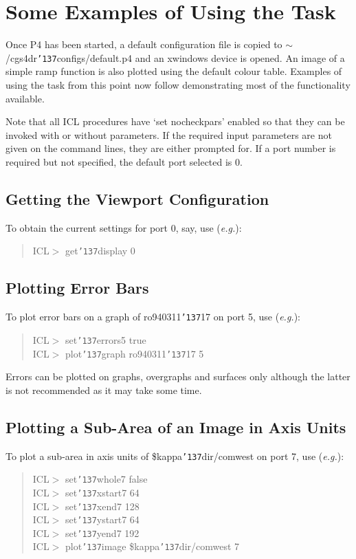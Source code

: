 \documentclass[a4paper]{book}
\renewcommand{\_}{{\tt\char'137}}
\begin{document}
\section{Some Examples of Using the Task}
Once P4 has been started, a default configuration file is copied to
$\sim$/cgs4dr\_configs/default.p4 and an xwindows device is opened. An
image of a simple ramp function is also plotted using the default
colour table. Examples of using the task from this point now follow
demonstrating most of the functionality available.

Note that all ICL procedures have `set nocheckpars' enabled so that
they can be invoked with or without parameters. If the required input
parameters are not given on the command lines, they are either prompted
for. If a port number is required but not specified, the default port
selected is 0.

\subsection{Getting the Viewport Configuration}
To obtain the current settings for port 0, say, use ({\em e.g.}):

\begin{quote}
ICL$>$ get\_display 0
\end{quote}

\subsection{Plotting Error Bars}
To plot error bars on a graph of ro940311\_17 on port 5, use ({\em e.g.}):

\begin{quote}
ICL$>$ set\_errors5 true \\
ICL$>$ plot\_graph ro940311\_17 5
\end{quote}

Errors can be plotted on graphs, overgraphs and surfaces only although
the latter is not recommended as it may take some time.

\subsection{Plotting a Sub-Area of an Image in Axis Units}
To plot a sub-area in axis units of {\sc \$kappa\_dir}/comwest on port
7, use ({\em e.g.}):

\begin{quote}
ICL$>$ set\_whole7 false \\
ICL$>$ set\_xstart7 64 \\
ICL$>$ set\_xend7 128 \\
ICL$>$ set\_ystart7 64 \\
ICL$>$ set\_yend7 192 \\
ICL$>$ plot\_image {\sc \$kappa\_dir}/comwest 7
\end{quote}
\end{document}
